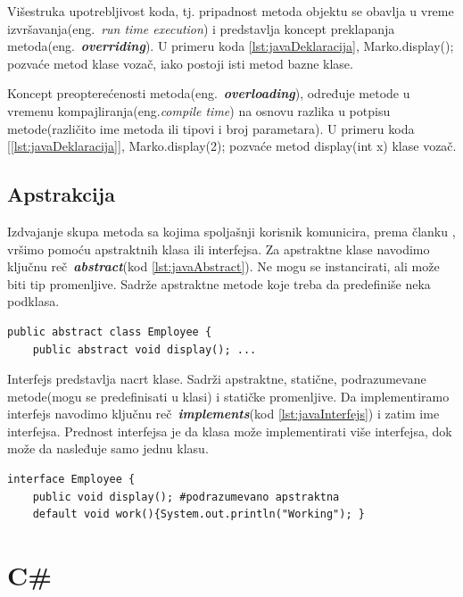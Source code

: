 \documentclass[a4paper]{article}
\begin{document}
{Višestruka upotrebljivost koda, tj. pripadnost metoda objektu se obavlja u vreme izvršavanja(eng.~{\em run time execution}) i predstavlja koncept preklapanja metoda(eng.~{\em\textbf{overriding}})\cite{horstmann2017core}. U primeru koda \ref{lst:javaDeklaracija}, Marko.display(); pozvaće metod klase vozač, iako postoji isti metod bazne klase.

Koncept preopterećenosti metoda(eng.~{\em\textbf{overloading}})\cite{horstmann2017core}, određuje metode u vremenu kompajliranja(eng.{\em compile time}) na osnovu razlika u potpisu metode(različito ime metoda ili tipovi i broj parametara). U primeru koda [\ref{lst:javaDeklaracija}], Marko.display(2); pozvaće metod display(int x) klase vozač.

\subsection{Apstrakcija}
\label{subsec:javaApstrakcija}

Izdvajanje skupa metoda sa kojima spoljašnji korisnik komunicira, prema članku \cite{oopJava}, vršimo pomoću apstraktnih klasa ili interfejsa.
Za apstraktne klase navodimo ključnu reč~{\em \textbf{abstract}}(kod \ref{lst:javaAbstract}). Ne mogu se instancirati, ali može biti tip promenljive. Sadrže apstraktne metode koje treba da predefiniše neka podklasa.

\begin{lstlisting}[caption={Apstraktna klasa},frame=single, label=lst:javaAbstract]
public abstract class Employee {
	public abstract void display(); ...
\end{lstlisting}

Interfejs predstavlja nacrt klase. Sadrži apstraktne, statične, podrazumevane metode(mogu se predefinisati u klasi) i statičke promenljive. Da implementiramo interfejs navodimo ključnu reč~{\em \textbf{implements}}(kod \ref{lst:javaInterfejs}) i zatim ime interfejsa. Prednost interfejsa\cite{horstmann2017core} je da klasa može implementirati više interfejsa, dok može da nasleđuje samo jednu klasu.

\begin{lstlisting}[caption={Interfejs},frame=single, label=lst:javaInterfejs]
interface Employee {
	public void display(); #podrazumevano apstraktna
	default void work(){System.out.println("Working"); }
\end{lstlisting}


\section{C\#}
\label{sec:csharp}

}
\end{document}
